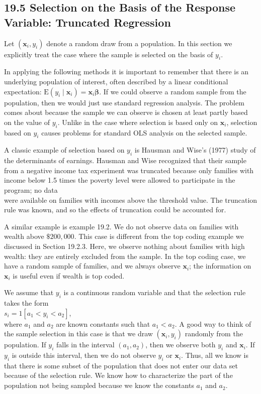 \documentclass[10pt]{article}
\begin{document}
\subsection*{19.5 Selection on the Basis of the Response Variable: Truncated Regression}
Let $\left(\mathbf{x}_{i}, y_{i}\right)$ denote a random draw from a population. In this section we explicitly treat the case where the sample is selected on the basis of $y_{i}$.

In applying the following methods it is important to remember that there is an underlying population of interest, often described by a linear conditional expectation: $\mathrm{E}\left(y_{i} \mid \mathbf{x}_{i}\right)=\mathbf{x}_{i} \boldsymbol{\beta}$. If we could observe a random sample from the population, then we would just use standard regression analysis. The problem comes about because the sample we can observe is chosen at least partly based on the value of $y_{i}$. Unlike in the case where selection is based only on $\mathbf{x}_{i}$, selection based on $y_{i}$ causes problems for standard OLS analysis on the selected sample.

A classic example of selection based on $y_{i}$ is Hausman and Wise's (1977) study of the determinants of earnings. Hausman and Wise recognized that their sample from a negative income tax experiment was truncated because only families with income below 1.5 times the poverty level were allowed to participate in the program; no data\\
were available on families with incomes above the threshold value. The truncation rule was known, and so the effects of truncation could be accounted for.

A similar example is example 19.2. We do not observe data on families with wealth above $\$ 200,000$. This case is different from the top coding example we discussed in Section 19.2.3. Here, we observe nothing about families with high wealth: they are entirely excluded from the sample. In the top coding case, we have a random sample of families, and we always observe $\mathbf{x}_{i}$; the information on $\mathbf{x}_{i}$ is useful even if wealth is top coded.

We assume that $y_{i}$ is a continuous random variable and that the selection rule takes the form\\
$s_{i}=1\left[a_{1}<y_{i}<a_{2}\right]$,\\
where $a_{1}$ and $a_{2}$ are known constants such that $a_{1}<a_{2}$. A good way to think of the sample selection in this case is that we draw $\left(\mathbf{x}_{i}, y_{i}\right)$ randomly from the population. If $y_{i}$ falls in the interval $\left(a_{1}, a_{2}\right)$, then we observe both $y_{i}$ and $\mathbf{x}_{i}$. If $y_{i}$ is outside this interval, then we do not observe $y_{i}$ or $\mathbf{x}_{i}$. Thus, all we know is that there is some subset of the population that does not enter our data set because of the selection rule. We know how to characterize the part of the population not being sampled because we know the constants $a_{1}$ and $a_{2}$.
\end{document}
